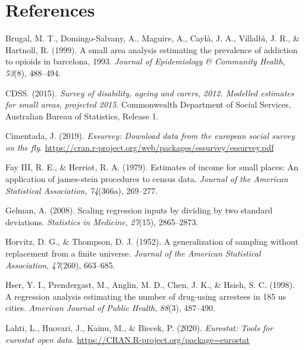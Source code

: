 \documentclass[
]{article}
\begin{document}
\hypertarget{references}{%
\section*{References}\label{references}}

\hypertarget{refs}{}
\leavevmode\hypertarget{ref-brugal1999}{}%
Brugal, M. T., Domingo-Salvany, A., Maguire, A., Caylà, J. A., Villalbı́,
J. R., \& Hartnoll, R. (1999). A small area analysis estimating the
prevalence of addiction to opioids in barcelona, 1993. \emph{Journal of
Epidemiology \& Community Health}, \emph{53}(8), 488--494.

\leavevmode\hypertarget{ref-commonwealth2015}{}%
CDSS. (2015). \emph{Survey of disability, ageing and carers, 2012.
Modelled estimates for small areas, projected 2015}. Commonwealth
Department of Social Services, Australian Bureau of Statistics, Release
1.

\leavevmode\hypertarget{ref-cimentada2019}{}%
Cimentada, J. (2019). \emph{Essurvey: Download data from the european
social survey on the fly}.
\url{https://cran.r-project.org/web/packages/essurvey/essurvey.pdf}

\leavevmode\hypertarget{ref-fay1979}{}%
Fay III, R. E., \& Herriot, R. A. (1979). Estimates of income for small
places: An application of james-stein procedures to census data.
\emph{Journal of the American Statistical Association}, \emph{74}(366a),
269--277.

\leavevmode\hypertarget{ref-gelman2008}{}%
Gelman, A. (2008). Scaling regression inputs by dividing by two standard
deviations. \emph{Statistics in Medicine}, \emph{27}(15), 2865--2873.

\leavevmode\hypertarget{ref-horvitz1952}{}%
Horvitz, D. G., \& Thompson, D. J. (1952). A generalization of sampling
without replacement from a finite universe. \emph{Journal of the
American Statistical Association}, \emph{47}(260), 663--685.

\leavevmode\hypertarget{ref-hser1998}{}%
Hser, Y. I., Prendergast, M., Anglin, M. D., Chen, J. K., \& Hsieh, S.
C. (1998). A regression analysis estimating the number of drug-using
arrestees in 185 us cities. \emph{American Journal of Public Health},
\emph{88}(3), 487--490.

\leavevmode\hypertarget{ref-lahti2020}{}%
Lahti, L., Huovari, J., Kainu, M., \& Biecek, P. (2020). \emph{Eurostat:
Tools for eurostat open data}.
\url{https://CRAN.R-project.org/package=eurostat}
\end{document}

